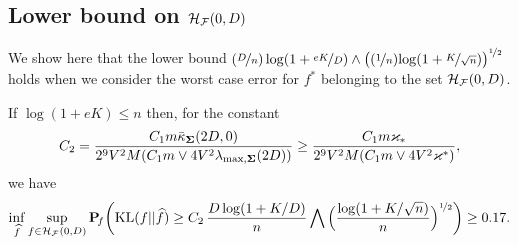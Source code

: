 \subsection{Lower bound on $\mathcal H_\mathcal F(0,D)$} %

We show here that the lower bound ${(\nicefrac{D}n)\log(1+\nicefrac{e K}D)}
\wedge\big((\nicefrac1n){\log(1+\nicefrac{K}{\sqrt{n}})}\big)^{\nicefrac12}$ holds 
when we consider the worst case  error for $f^*$ belonging to the set $\mathcal H_\mathcal F(0,D)$. 
\begin{proposition}
	\label{prop:lower:1}
	If $\log(1+eK)\le  n$ then, for the constant
	\begin{equation}
	C_2=\frac{C_1 m\bar\kappa_{\boldsymbol\Sigma}(2D,0)}{2^{9}V^2 M(C_1m\vee 4V^2\lambda_{\max,\boldsymbol\Sigma}(2D))}
	\ge \frac{C_1 m\varkappa_*}{2^{9}V^2 M(C_1m\vee 4V^2\varkappa^*)},
	\end{equation} 
	we have
	\begin{equation}
	\inf_{\widehat f}\sup_{f \in \mathcal H_\mathcal F(0,D)}\mathbf P\!_{f}\bigg({\rm KL}(f||\widehat f)\geq
	C_2\,\frac{D\log(1+ K/D)}{n}\bigwedge\Big(\frac{\log(1+K/\sqrt{n})}{n}\Big)^{\nicefrac12}\bigg)
	\geq 0.17.
	\end{equation}
\end{proposition}

